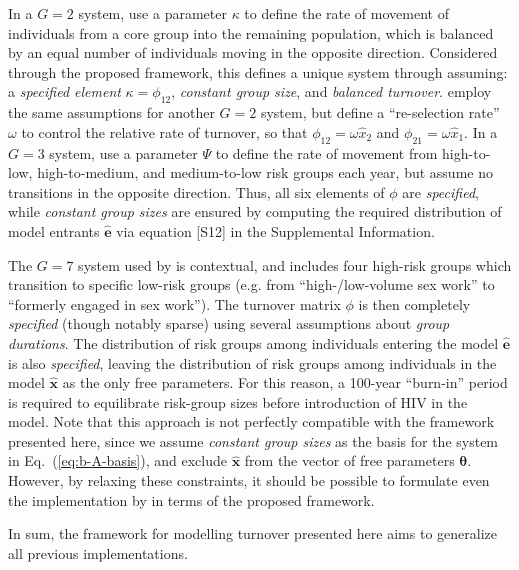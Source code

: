 In a $G = 2$ system,								
\citet{Stigum1994} use a parameter $\kappa$ to define
the rate of movement of individuals from a core group into the remaining population,
which is balanced by an equal number of individuals moving in the opposite direction.
Considered through the proposed framework,
this defines a unique system through assuming:
a \emph{specified element} $\kappa = \phi_{12}$,
\emph{constant group size}, and \emph{balanced turnover}.
\citet{Henry2015} employ the same assumptions for another $G = 2$ system,
but define a ``re-selection rate'' $\omega$ to control
the relative rate of turnover, so that
$\phi_{12} = \omega \hat{x}_{2}$ and $\phi_{21} = \omega \hat{x}_{1}$.
In a $G = 3$ system,
\citet{Eaton2014} use a parameter $\Psi$ to define the rate of movement from
high-to-low, high-to-medium, and medium-to-low risk groups each year,
but assume no transitions in the opposite direction.
Thus, all six elements of $\phi$ are \emph{specified},
while \emph{constant group sizes} are ensured by computing
the required distribution of model entrants $\bm{\hat{e}}$
via equation [S12] in the Supplemental Information.
\par
The $G = 7$ system used by
\citet{Boily2015} is contextual, and							%
includes four high-risk groups which transition to specific low-risk groups
(e.g. from ``high-/low-volume sex work'' to ``formerly engaged in sex work'').
The turnover matrix $\phi$ is then completely \emph{specified} (though notably sparse)
using several assumptions about \emph{group durations}.
The distribution of risk groups among individuals entering the model $\bm{\hat{e}}$
is also \emph{specified},
leaving the distribution of risk groups among individuals in the model $\bm{\hat{x}}$
as the only free parameters.
For this reason, a 100-year ``burn-in'' period is required
to equilibrate risk-group sizes before introduction of HIV in the model.
Note that this approach is not perfectly compatible with the framework presented here,			%
since we assume \emph{constant group sizes}
as the basis for the system in Eq.~(\ref{eq:b-A-basis}),
and exclude $\bm{\hat{x}}$ from the vector of free parameters $\bm{\theta}$.
However, by relaxing these constraints,
it should be possible to formulate even the implementation by \citet{Boily2015}					%
in terms of the proposed framework.													%
\par
In sum, the framework for modelling turnover presented here aims to generalize				%
all previous implementations.
